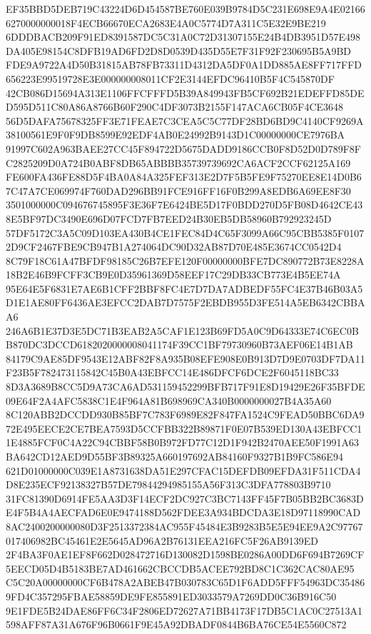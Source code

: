 \documentclass[UTF8,fontset=fandol,zihao=-4,a4paper]{ctexart}
\begin{document}
{{EF35BBD5DEB719C43224D6D454587BE760E039B9784D5C231E698E9A4E021666270000000018F4ECB66670ECA2683E4A0C5774D7A311C5E32E9BE219
6DDDBACB209F91ED8391587DC5C31A0C72D31307155E24B4DB3951D57E498DA405E98154C8DFB19AD6FD2D8D0539D435D55E7F31F92F230695B5A9BD
FDE9A9722A4D50B31815AB78FB73311D4312DA5DF0A1DD885AE8FF717FFD656223E99519728E3E000000008011CF2E3144EFDC96410B5F4C545870DF
42CB086D15694A313E1106FFCFFFD5B39A849943FB5CF692B21EDEFFD85DED595D511C80A86A8766B60F290C4DF3073B2155F147ACA6CB05F4CE3648
56D5DAFA75678325FF3E71FEAE7C3CEA5C5C77DF28BD6BD9C4140CF9269A38100561E9F0F9DB8599E92EDF4AB0E24992B9143D1C00000000CE7976BA
91997C602A963BAEE27CC45F894722D5675DADD9186CCB0F8D52D0D789F8FC2825209D0A724B0ABF8DB65ABBBB35739739692CA6ACF2CCF62125A169
FE600FA436FE88D5F4BA0A84A325FEF313E2D7F5B5FE9F75270EE8E14D0B67C47A7CE069974F760DAD296BB91FCE916FF16F0B299A8EDB6A69EE8F30
3501000000C094676745895F3E36F7E6424BE5D17F0BDD270D5FB08D4642CE438E5BF97DC3490E696D07FCD7FB7EED24B30EB5DB58960B792923245D
57DF5172C3A5C09D103EA430B4CE1FEC84D4C65F3099A66C95CBB5385F01072D9CF2467FBE9CB947B1A274064DC90D32AB87D70E485E3674CC0542D4
8C79F18C61A47BFDF98185C26B7EFE120F00000000BFE7DC890772B73E8228A18B2E46B9FCFF3CB9E0D35961369D58EEF17C29DB33CB773E4B5EE74A
95E64E5F6831E7AE6B1CFF2BBF8FC4E7D7DA7ADBEDF55FC4E37B46B03A5D1E1AE80FF6436AE3EFCC2DAB7D7575F2EBDB955D3FE514A5EB6342CBBAA6
246A6B1E37D3E5DC71B3EAB2A5CAF1E123B69FD5A0C9D64333E74C6EC0BB870DC3DCCD6182020000008041174F39CC1BF79730960B73AEF06E14B1AB
84179C9AE85DF9543E12ABF82F8A935B08EFE908E0B913D7D9E0703DF7DA11F23B5F782473115842C45B0A43EBFCC14E486DFCF6DCE2F6045118BC33
8D3A3689B8CC5D9A73CA6AD531159452299BFB717F91E8D19429E26F35BFDE09E64F2A4AFC5838C1E4F964A81B698969CA340B0000000027B4A35A60
8C120ABB2DCCDD930B85BF7C783F6989E82F847FA1524C9FEAD50BBC6DA972E495EECE2CE7BEA7593D5CCFBB322B89871F0E07B539ED130A43EBFCC1
1E4885FCF0C4A22C94CBBF58B0B972FD77C12D1F942B2470AEE50F1991A63BA642CD12AED9D55BF3B89325A660197692AB84160F9327B1B9FC586E94
621D01000000C039E1A8731638DA51E297CFAC15DEFDB09EFDA31F511CDA4D8E235ECF92138327B57DE79844294985155A56F313C3DFA778803B9710
31FC81390D6914FE5AA3D3F14ECF2DC927C3BC7143FF45F7B05BB2BC3683DE4F5B4A4AECFAD6E0E9474188D562FDEE3A934BDCDA3E18D97118990CAD
8AC2400200000080D3F2513372384AC955F45484E3B9283B5E5E94EE9A2C97767017406982BC45461E2E5645AD96A2B76131EEA216FC5F26AB9139ED
2F4BA3F0AE1EF8F662D028472716D130082D1598BE0286A00DD6F694B7269CF5EECD05D4B5183BE7AD461662CBCCDB5ACEE792BD8C1C362CAC80AE95
C5C20A00000000CF6B478A2ABEB47B030783C65D1F6ADD5FFF54963DC354869FD4C357295FBAE58859DE9FE855891ED3033579A7269DD0C36B916C50
9E1FDE5B24DAE86FF6C34F2806ED72627A71BB4173F17DB5C1AC0C27513A1598AFF87A31A676F96B0661F9E45A92DBADF0844B6BA76CE54E5560C872
}}
\end{document}
